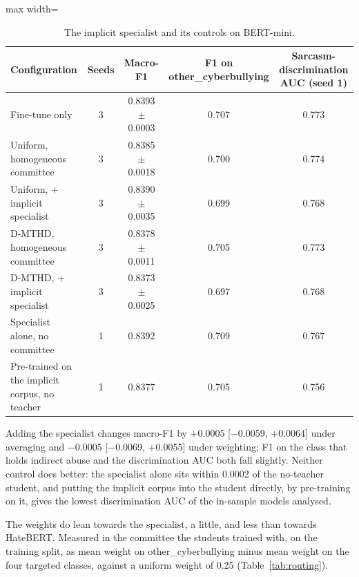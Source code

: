 \begin{table}[htbp]
\centering
\small
\caption{The implicit specialist and its controls on BERT-mini.}
\label{tab:specialist}
\begin{adjustbox}{max width=\textwidth}
\begin{tabular}{lcccc}
\toprule
Configuration & Seeds & Macro-F1 & F1 on other\_cyberbullying & Sarcasm-discrimination AUC (seed 1) \\
\midrule
Fine-tune only & 3 & 0.8393 $\pm$ 0.0003 & 0.707 & 0.773 \\
Uniform, homogeneous committee & 3 & 0.8385 $\pm$ 0.0018 & 0.700 & 0.774 \\
Uniform, + implicit specialist & 3 & 0.8390 $\pm$ 0.0035 & 0.699 & 0.768 \\
D-MTHD, homogeneous committee & 3 & 0.8378 $\pm$ 0.0011 & 0.705 & 0.773 \\
D-MTHD, + implicit specialist & 3 & 0.8373 $\pm$ 0.0025 & 0.697 & 0.768 \\
Specialist alone, no committee & 1 & 0.8392 & 0.709 & 0.767 \\
Pre-trained on the implicit corpus, no teacher & 1 & 0.8377 & 0.705 & 0.756 \\
\bottomrule
\end{tabular}
\end{adjustbox}
\end{table}

Adding the specialist changes macro-F1 by +0.0005 [$-$0.0059, +0.0064] under averaging and $-$0.0005
[$-$0.0069, +0.0055] under weighting; F1 on the class that holds indirect abuse and the
discrimination AUC both fall slightly. Neither control does better: the specialist alone sits within
0.0002 of the no-teacher student, and putting the implicit corpus into the student directly, by
pre-training on it, gives the lowest discrimination AUC of the in-sample models analysed.

The weights do lean towards the specialist, a little, and less than towards HateBERT. Measured in
the committee the students trained with, on the training split, as mean weight on
other\_cyberbullying minus mean weight on the four targeted classes, against a uniform weight of
0.25 (Table~\ref{tab:routing}).

